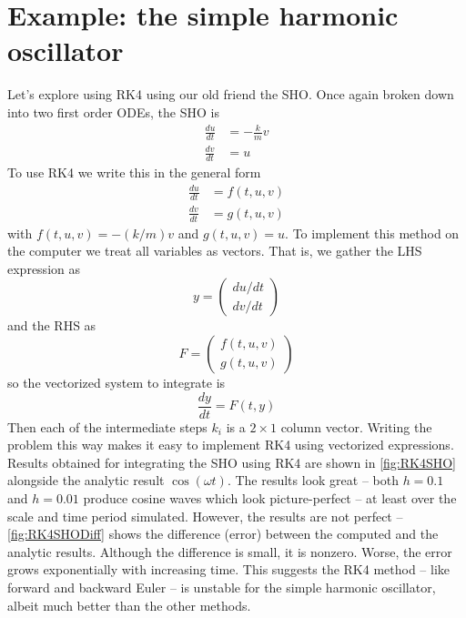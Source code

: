\documentclass[hidelinks,notitlepage]{book}
\begin{document}
\section{Example: the simple harmonic oscillator}
Let's explore using RK4 using our old friend the SHO.  Once again broken down into two first order ODEs, the SHO is
\begin{align}
\nonumber
\frac{d u}{d t} &= -\frac{k}{m} v  \\
\nonumber
\frac{d v}{d t} &= u
\end{align}
To use RK4 we write this in the general form
\begin{equation}
\begin{aligned}
\frac{d u}{d t} &= f(t, u, v)  \\
\frac{d v}{d t} &= g(t, u, v)
\end{aligned}
\label{eq:RK4SHOSystem}
\end{equation}
with $f(t, u, v) = -(k/m) v$ and $g(t, u, v) = u$.  
To implement this method on the computer we treat all variables as vectors.  That is, we gather the LHS expression as
\begin{equation}
\nonumber
y = 
\begin{pmatrix}
du/dt \\
dv/dt
\end{pmatrix} 
\end{equation}
and the RHS as
\begin{equation}
\nonumber
F = 
\begin{pmatrix}
f(t, u, v) \\
g(t, u, v)
\end{pmatrix} 
\end{equation}
so the vectorized system to integrate is
\begin{equation}
\nonumber
\frac{dy}{dt} = 
F(t, y)
\end{equation}
Then each of the intermediate steps $k_i$ is a $2 \times 1$ column vector.  Writing the problem this way makes it easy to implement RK4 using vectorized expressions.  Results obtained for integrating the SHO using RK4 are shown in \cref{fig:RK4SHO} alongside the analytic result $\cos(\omega t)$.  The results look great -- both $h = 0.1$ and $h=0.01$ produce cosine waves which look picture-perfect -- at least over the scale and time period simulated.  However, the results are not perfect -- \cref{fig:RK4SHODiff} shows the difference (error) between the computed and the analytic results.  Although the difference is small, it is nonzero.  Worse, the error grows exponentially with increasing time.  This suggests the RK4 method -- like forward and backward Euler -- is unstable for the simple harmonic oscillator, albeit much better than the other methods.
\end{document}
